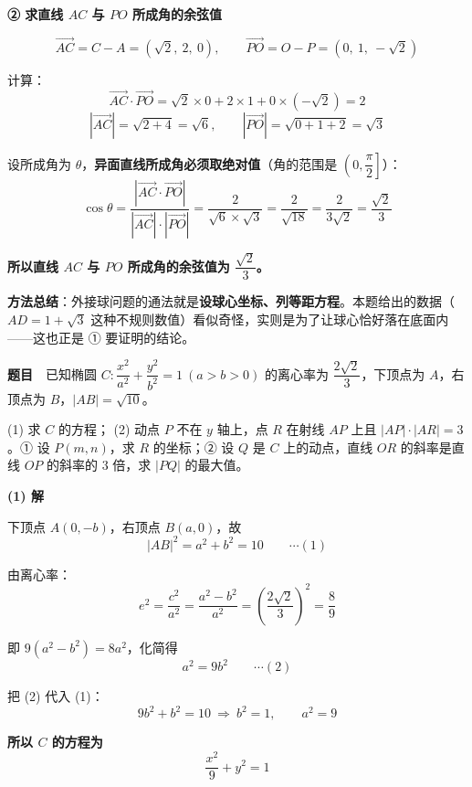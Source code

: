 \textbf{② 求直线 $AC$ 与 $PO$ 所成角的余弦值}

\[\overrightarrow{AC}=C-A=\left(\sqrt2,\ 2,\ 0\right),\qquad \overrightarrow{PO}=O-P=\left(0,\ 1,\ -\sqrt2\right)\]

计算：
\[\overrightarrow{AC}\cdot\overrightarrow{PO}=\sqrt2\times0+2\times1+0\times\left(-\sqrt2\right)=2\]
\[\left|\overrightarrow{AC}\right|=\sqrt{2+4}=\sqrt6,\qquad \left|\overrightarrow{PO}\right|=\sqrt{0+1+2}=\sqrt3\]

设所成角为 $\theta$，\textbf{异面直线所成角必须取绝对值}（角的范围是 $\left(0,\dfrac\pi2\right]$）：
\[\cos\theta=\frac{\left|\overrightarrow{AC}\cdot\overrightarrow{PO}\right|}{\left|\overrightarrow{AC}\right|\cdot\left|\overrightarrow{PO}\right|}=\frac{2}{\sqrt6\times\sqrt3}=\frac{2}{\sqrt{18}}=\frac{2}{3\sqrt2}=\frac{\sqrt2}{3}\]

\textbf{所以直线 $AC$ 与 $PO$ 所成角的余弦值为 $\dfrac{\sqrt2}{3}$。}

\begin{gktip}
\textbf{方法总结}：外接球问题的通法就是\textbf{设球心坐标、列等距方程}。本题给出的数据（$AD=1+\sqrt3$ 这种不规则数值）看似奇怪，实则是为了让球心恰好落在底面内——这也正是 ① 要证明的结论。
\end{gktip}

\par\medskip


\textbf{题目}　已知椭圆 $C:\dfrac{x^2}{a^2}+\dfrac{y^2}{b^2}=1\ (a>b>0)$ 的离心率为 $\dfrac{2\sqrt2}{3}$，下顶点为 $A$，右顶点为 $B$，$|AB|=\sqrt{10}$。

  (1) 求 $C$ 的方程；
  (2) 动点 $P$ 不在 $y$ 轴上，点 $R$ 在射线 $AP$ 上且 $|AP|\cdot|AR|=3$。① 设 $P(m,n)$，求 $R$ 的坐标；② 设 $Q$ 是 $C$ 上的动点，直线 $OR$ 的斜率是直线 $OP$ 的斜率的 $3$ 倍，求 $|PQ|$ 的最大值。

\par\medskip

\textbf{(1) 解}

下顶点 $A(0,-b)$，右顶点 $B(a,0)$，故
\[|AB|^2=a^2+b^2=10\qquad\cdots(1)\]

由离心率：
\[e^2=\frac{c^2}{a^2}=\frac{a^2-b^2}{a^2}=\left(\frac{2\sqrt2}{3}\right)^2=\frac89\]

即 $9\left(a^2-b^2\right)=8a^2$，化简得
\[a^2=9b^2\qquad\cdots(2)\]

把 (2) 代入 (1)：
\[9b^2+b^2=10\ \Longrightarrow\ b^2=1,\qquad a^2=9\]

\textbf{所以 $C$ 的方程为}
\[\frac{x^2}{9}+y^2=1\]

